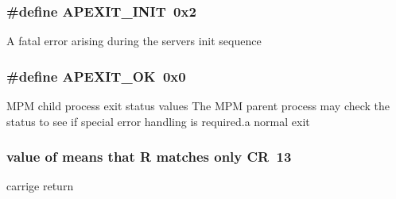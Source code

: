 \subsubsection[{\texorpdfstring{A\+P\+E\+X\+I\+T\+\_\+\+I\+N\+IT}{APEXIT_INIT}}]{\setlength{\rightskip}{0pt plus 5cm}\#define A\+P\+E\+X\+I\+T\+\_\+\+I\+N\+IT~0x2}\hypertarget{group__APACHE__CORE__DAEMON_ga24875285f74462463d2ba76bc3ff64b8}{}\label{group__APACHE__CORE__DAEMON_ga24875285f74462463d2ba76bc3ff64b8}
A fatal error arising during the server\textquotesingle{}s init sequence 
\subsubsection[{\texorpdfstring{A\+P\+E\+X\+I\+T\+\_\+\+OK}{APEXIT_OK}}]{\setlength{\rightskip}{0pt plus 5cm}\#define A\+P\+E\+X\+I\+T\+\_\+\+OK~0x0}\hypertarget{group__APACHE__CORE__DAEMON_ga2397a8dff5b05e1856799982519a8c97}{}\label{group__APACHE__CORE__DAEMON_ga2397a8dff5b05e1856799982519a8c97}
M\+PM child process exit status values The M\+PM parent process may check the status to see if special error handling is required.\+a normal exit 
\subsubsection[{\texorpdfstring{CR}{CR}}]{ {\bf value} {\bf of} means that {\bf R} {\bf matches} only CR~13}\hypertarget{group__APACHE__CORE__DAEMON_gac7dc463c440edc9cf8f6a1e316e0b55b}{}\label{group__APACHE__CORE__DAEMON_gac7dc463c440edc9cf8f6a1e316e0b55b}
carrige return 
